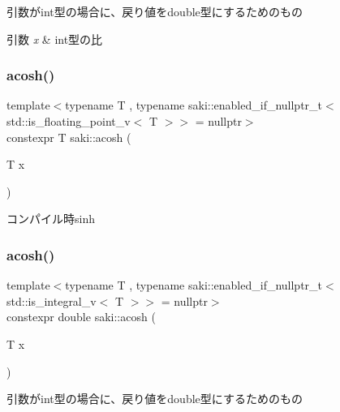 引数がint型の場合に、戻り値をdouble型にするためのもの 


\begin{DoxyParams}{引数}
{\em x} & int型の比 \\
\hline
\end{DoxyParams}
\mbox{\label{namespacesaki_ac1c85a4defc25dc9eb6b380f29946f83}} 
\subsubsection{\texorpdfstring{acosh()}{acosh()}\hspace{0.1cm}{\footnotesize\ttfamily [1/2]}}
{\footnotesize\ttfamily template$<$typename T , typename saki\+::enabled\+\_\+if\+\_\+nullptr\+\_\+t$<$ std\+::is\+\_\+floating\+\_\+point\+\_\+v$<$ T $>$$>$  = nullptr$>$ \\
constexpr T saki\+::acosh (\begin{DoxyParamCaption}\item[{T}]{x }\end{DoxyParamCaption})}



コンパイル時sinh 

\mbox{\label{namespacesaki_a8d3766d425082661e966b04504b90002}} 
\subsubsection{\texorpdfstring{acosh()}{acosh()}\hspace{0.1cm}{\footnotesize\ttfamily [2/2]}}
{\footnotesize\ttfamily template$<$typename T , typename saki\+::enabled\+\_\+if\+\_\+nullptr\+\_\+t$<$ std\+::is\+\_\+integral\+\_\+v$<$ T $>$$>$  = nullptr$>$ \\
constexpr double saki\+::acosh (\begin{DoxyParamCaption}\item[{T}]{x }\end{DoxyParamCaption})}



引数がint型の場合に、戻り値をdouble型にするためのもの 

\mbox{\label{namespacesaki_a63f2b40515cd62b037dade64aa8465db}} 
